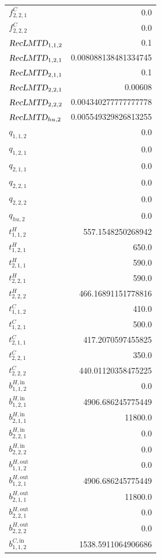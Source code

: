 \documentclass{article}%
\begin{document}
\begin{multicols*}{3}
\begin{supertabular}{lr}
	$f_{2,2,1}^{C}$ & 0.0 \\%
	$f_{2,2,2}^{C}$ & 0.0 \\%
	$\textsl{RecLMTD}_{1,1,2}$ & 0.1 \\%
	$\textsl{RecLMTD}_{1,2,1}$ & 0.008088138481334745 \\%
	$\textsl{RecLMTD}_{2,1,1}$ & 0.1 \\%
	$\textsl{RecLMTD}_{2,2,1}$ & 0.00608 \\%
	$\textsl{RecLMTD}_{2,2,2}$ & 0.004340277777777778 \\%
	$\textsl{RecLMTD}_{hu,2}$ & 0.005549329826813255 \\%
	$q_{1,1,2}$ & 0.0 \\%
	$q_{1,2,1}$ & 0.0 \\%
	$q_{2,1,1}$ & 0.0 \\%
	$q_{2,2,1}$ & 0.0 \\%
	$q_{2,2,2}$ & 0.0 \\%
	$q_{hu,2}$ & 0.0 \\%
	$t_{1,1,2}^{H}$ & 557.1548250268942 \\%
	$t_{1,2,1}^{H}$ & 650.0 \\%
	$t_{2,1,1}^{H}$ & 590.0 \\%
	$t_{2,2,1}^{H}$ & 590.0 \\%
	$t_{2,2,2}^{H}$ & 466.16891151778816 \\%
	$t_{1,1,2}^{C}$ & 410.0 \\%
	$t_{1,2,1}^{C}$ & 500.0 \\%
	$t_{2,1,1}^{C}$ & 417.2070597455825 \\%
	$t_{2,2,1}^{C}$ & 350.0 \\%
	$t_{2,2,2}^{C}$ & 440.01120358475225 \\%
	$b_{1,1,2}^{H,\text{in}}$ & 0.0 \\%
	$b_{1,2,1}^{H,\text{in}}$ & 4906.686245775449 \\%
	$b_{2,1,1}^{H,\text{in}}$ & 11800.0 \\%
	$b_{2,2,1}^{H,\text{in}}$ & 0.0 \\%
	$b_{2,2,2}^{H,\text{in}}$ & 0.0 \\%
	$b_{1,1,2}^{H,\text{out}}$ & 0.0 \\%
	$b_{1,2,1}^{H,\text{out}}$ & 4906.686245775449 \\%
	$b_{2,1,1}^{H,\text{out}}$ & 11800.0 \\%
	$b_{2,2,1}^{H,\text{out}}$ & 0.0 \\%
	$b_{2,2,2}^{H,\text{out}}$ & 0.0 \\%
	$b_{1,1,2}^{C,\text{in}}$ & 1538.5911064906686 \\%

\end{supertabular}
\end{multicols*}
\end{document}
